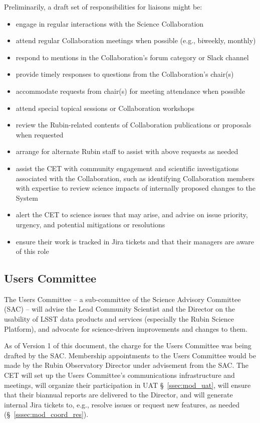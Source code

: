 \documentclass[DM,lsstdraft,toc]{lsstdoc}
\begin{document}
Preliminarily, a draft set of responsibilities for liaisons might be:
\begin{itemize}
\item engage in regular interactions with the Science Collaboration
\item attend regular Collaboration meetings when possible (e.g., biweekly, monthly)
\item respond to mentions in the Collaboration's forum category or Slack channel
\item provide timely responses to questions from the Collaboration's chair(s)
\item accommodate requests from chair(s) for meeting attendance when possible
\item attend special topical sessions or Collaboration workshops
\item review the Rubin-related contents of Collaboration publications or proposals when requested
\item arrange for alternate Rubin staff to assist with above requests as needed
\item assist the CET with community engagement and scientific investigations associated with the Collaboration, such as identifying Collaboration members with expertise to review science impacts of internally proposed changes to the System
\item alert the CET to science issues that may arise, and advise on issue priority, urgency, and potential mitigations or resolutions
\item ensure their work is tracked in Jira tickets and that their managers are aware of this role
\end{itemize}


\subsection{Users Committee}\label{ssec:mod_uc}

The Users Committee -- a sub-committee of the Science Advisory Committee (SAC) -- will advise the Lead Community Scientist and the Director on the usability of LSST data products and services (especially the Rubin Science Platform), and advocate for science-driven improvements and changes to them.

As of Version 1 of this document, the charge for the Users Committee was being drafted by the SAC.
Membership appointments to the Users Committee would be made by the Rubin Observatory Director under advisement from the SAC.
The CET will set up the Users Committee's communications infrastructure and meetings, will organize their participation in UAT \S~\ref{ssec:mod_uat}, will ensure that their biannual reports are delivered to the Director, and will generate internal Jira tickets to, e.g., resolve issues or request new features, as needed (\S~\ref{sssec:mod_coord_res}). 
\end{document}
